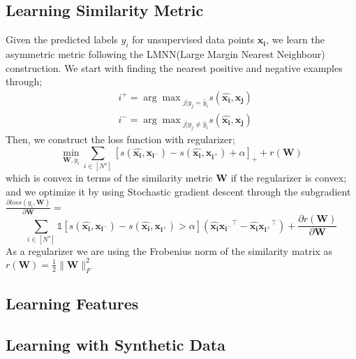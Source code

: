 \subsection{Learning Similarity Metric}
Given the predicted labels $y_i$ for unsupervised data points $\mathbf{x_i}$, we learn the asymmetric metric following the LMNN(Large Margin Nearest Neighbour)\cite{lmnn} construction. We start with finding the nearest positive and negative examples through;
\begin{equation}
\begin{aligned}
&i^{+} = {\arg\max}_{j | y_j = \hat{y}_i} s(\mathbf{\hat{x_i}},\mathbf{x_{j}}) \\
&i^{-} = {\arg\max}_{j | y_j \neq \hat{y}_i} s(\mathbf{\hat{x_i}},\mathbf{x_{j}}) 
\end{aligned}
\end{equation}
Then, we construct the loss function with regularizer;
\begin{equation}
\min_{\mathbf{W}, y_i} \sum_{i \in [N^s]} [s(\mathbf{\hat{x_i}},\mathbf{x_{i^-}}) - s(\mathbf{\hat{x_i}},\mathbf{x_{i^+}}) + \alpha]_{+} + r(\mathbf{W})
\end{equation}
which is convex in terms of the similarity metric $\mathbf{W}$ if the regularizer is convex; and we optimize it by using Stochastic gradient descent through the subgradient $\frac{\partial loss (y_i, \mathbf{W})}{\partial \mathbf{W}} =$
\begin{equation}
\sum_{i \in [N^s]} \mathds{1}[s(\mathbf{\hat{x_i}},\mathbf{x_{i^-}}) - s(\mathbf{\hat{x_i}},\mathbf{x_{i^+}}) > \alpha] \left( \mathbf{\hat{x_i}}\mathbf{x_{i^-}}^\intercal - \mathbf{\hat{x_i}}\mathbf{x_{i^+}}^\intercal  \right)  + \frac{\partial r ( \mathbf{W})}{\partial \mathbf{W}}
\end{equation}
As a regularizer we are using the Frobenius norm of the similarity matrix as $r(\mathbf{W})=\frac{1}{2}\|\mathbf{W}\|_F^2$ 

\subsection{Learning Features}
\subsection{Learning with Synthetic Data}
